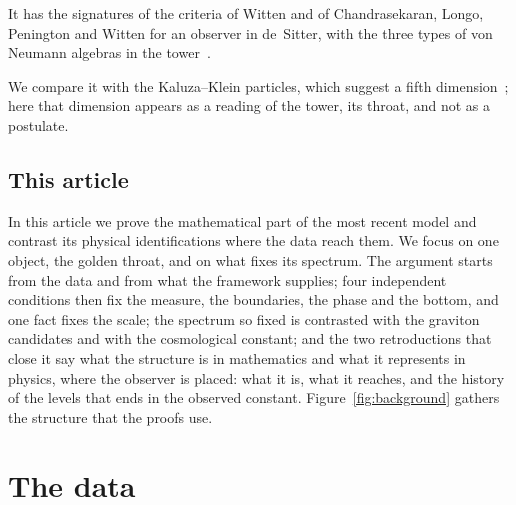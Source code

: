 \documentclass[11pt,reqno]{amsart}
\numberwithin{equation}{section}
\theoremstyle{remark}
\begin{document}
It has the signatures of the criteria of Witten and of Chandrasekaran, Longo, Penington and Witten
for an observer in de~Sitter, with the three types of von Neumann algebras in the
tower~\cite{Wit01,CLPW23,Wit24}.

We compare it with the Kaluza--Klein particles, which suggest a fifth dimension~\cite{Kal21,Kle26,LYR26}; here that
dimension appears as a reading of the tower, its throat, and not as a postulate.

\subsection{This article}
In this article we prove the mathematical part of the most recent model and contrast its physical
identifications where the data reach them. We focus on one object, the golden throat, and on what
fixes its spectrum. The argument starts from the data and from what the framework supplies; four
independent conditions then fix the measure, the boundaries, the phase and the bottom, and one fact
fixes the scale; the spectrum so fixed is contrasted with the graviton candidates and with the
cosmological constant; and the two retroductions that close it say what the structure is in
mathematics and what it represents in physics, where the observer is placed: what it is, what it
reaches, and the history of the levels that ends in the observed constant.
Figure~\ref{fig:background} gathers the structure that the proofs use.

\section{The data}\label{sec:data}
\end{document}
